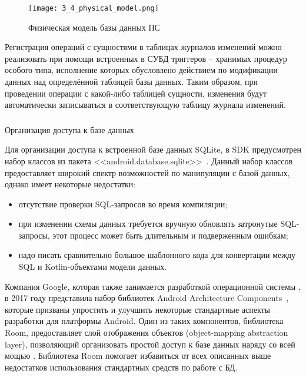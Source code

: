 \begin{figure}[p]
    \centering
    \texttt{[image: 3\_4\_physical\_model.png]}
    \caption{Физическая модель базы данных ПС}
    \label{fig:design:database:model:diagram}
\end{figure}

Регистрация операций с сущностями в таблицах журналов изменений можно реализовать при помощи встроенных в СУБД \sqlite триггеров -- хранимых процедур особого типа, исполнение которых обусловлено действием по модификации данных над определённой таблицей базы данных.
Таким образом, при проведении операции с какой-либо таблицей сущности, изменения будут автоматически записываться в соответствующую таблицу журнала изменений.

\subsubsection{} Организация доступа к базе данных
\label{sec:design:database:implementation}

Для организации доступа к встроенной базе данных SQLite, в \andro SDK предусмотрен набор классов из пакета <<android.database.sqlite>>~\cite{android_sqlite}.
Данный набор классов предоставляет широкий спектр возможностей по манипуляции с базой данных, однако имеет некоторые недостатки:
\begin{itemize}
    \item отсутствие проверки SQL-запросов во время компиляции;
    \item при изменении схемы данных требуется вручную обновлять затронутые SQL-запросы, этот процесс может быть длительным и подверженным ошибкам;
    \item надо писать сравнительно большое шаблонного кода для конвертации между SQL и Kotlin-объектами модели данных.
\end{itemize}

Компания Google, которая также занимается разработкой операционной системы \andro, в 2017 году представила набор библиотек Android Architecture Com\-po\-nents~\cite{android_components}, которые призваны упростить и улучшить некоторые стандартные аспекты разработки для платформы Android.
Один из таких компонентов, библиотека Room, предоставляет слой отображения  объектов (object-mapping abstraction layer), позволяющий организовать простой доступ к базе данных наряду со всей мощью \sqlite.
Библиотека Room помогает избавиться от всех описанных выше недостатков использования стандартных средств по работе с БД.

